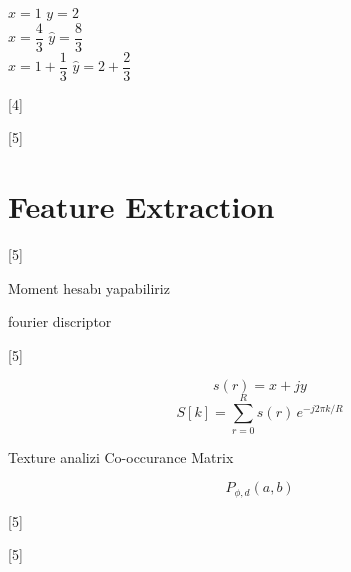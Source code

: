 \documentclass[11pt,a4paper]{article}
\begin{document}
$x=1$ \qquad $y=2$ \\
$\hat{x}=\dfrac{4}{3}$ \qquad $\hat{y}=\dfrac{8}{3}$ \\
$\hat{x}=1+\dfrac{1}{3}$ \qquad $\hat{y}=2+\dfrac{2}{3}$

[4]

[5]

\section{Feature Extraction}
[5]

Moment hesabı yapabiliriz

fourier discriptor

[5]

\[ s(r) = x + jy \]
\[ S[k] = \sum_{r=0}^{R} s(r)\, e^{-j2\pi k/R} \]

Texture analizi \qquad\qquad Co-occurance Matrix

\[ P_{\phi,d}(a,b) \]

[5]

[5]
\end{document}
